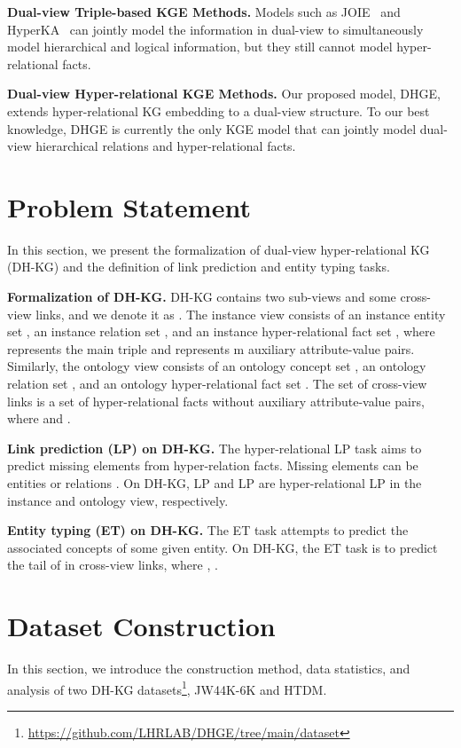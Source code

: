 \documentclass[letterpaper]{article} \usepackage{aaai23}  \usepackage{times}  \usepackage{helvet}  \usepackage{courier}  \usepackage[hyphens]{url}  \usepackage{graphicx} \urlstyle{rm} \def\UrlFont{\rm}  \usepackage{natbib}  \usepackage{caption} \frenchspacing  \setlength{\pdfpagewidth}{8.5in}  \setlength{\pdfpageheight}{11in}  \usepackage{times}
\begin{document}
{\bf Dual-view Triple-based KGE Methods. }
Models such as JOIE~\citep{JOIE} and HyperKA~\citep{HyperKA} can jointly model the information in dual-view to simultaneously model hierarchical and logical information, but they still cannot model hyper-relational facts.

{\bf Dual-view Hyper-relational KGE Methods. }
Our proposed model, DHGE, extends hyper-relational KG embedding to a dual-view structure. To our best knowledge, DHGE is currently the only KGE model that can jointly model dual-view hierarchical relations and hyper-relational facts.





\section{Problem Statement}
\label{s3}
In this section, we present the formalization of dual-view hyper-relational KG (DH-KG) and the definition of link prediction and entity typing tasks.

\textbf{Formalization of DH-KG.} DH-KG contains two sub-views and some cross-view links, and we denote it as . The instance view  consists of an instance entity set , an instance relation set , and an instance hyper-relational fact set , where  represents the main triple and  represents m auxiliary attribute-value pairs. Similarly, the ontology view  consists of an ontology concept set , an ontology relation set , and an ontology hyper-relational fact set . The set of cross-view links  is a set of hyper-relational facts without auxiliary attribute-value pairs, where  and .

\textbf{Link prediction (LP) on DH-KG.} The hyper-relational LP task aims to predict missing elements from hyper-relation facts. Missing elements can be entities  or relations . On DH-KG,  LP and  LP are hyper-relational LP in the instance and ontology view, respectively.

\textbf{Entity typing (ET) on DH-KG.} The ET task attempts to predict the associated concepts of some given entity. On DH-KG, the ET task is to predict the tail of  in cross-view links, where , .






\section{Dataset Construction}
\label{s4}
In this section, we introduce the construction method, data statistics, and analysis of two DH-KG datasets\footnote{\url{https://github.com/LHRLAB/DHGE/tree/main/dataset}}, JW44K-6K and HTDM.
\end{document}
